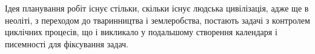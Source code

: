 Ідея планування робіт існує стільки, скільки існує людська цивілізація, адже ще в неоліті, з переходом до тваринництва і землеробства, постають задачі з контролем циклічних процесів, що і викликало у подальшому створення календаря і писемності для фіксування задач.
